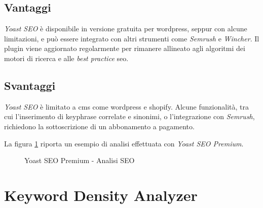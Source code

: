 \subsection{Vantaggi}
\par \textit{Yoast SEO} è disponibile in versione gratuita per \gls{wordpress}, seppur con alcune limitazioni, e può essere integrato con altri strumenti come \textit{Semrush} e \textit{Wincher}. Il plugin viene aggiornato regolarmente per rimanere allineato agli algoritmi dei motori di ricerca e alle \textit{best practice} \gls{seo}.

\subsection{Svantaggi}
\par \textit{Yoast SEO} è limitato a \gls{cms} come \gls{wordpress} e \gls{shopify}. Alcune funzionalità, tra cui l'inserimento di keyphrase correlate e sinonimi, o l'integrazione con \textit{Semrush}, richiedono la sottoscrizione di un abbonamento a pagamento.

\vspace{15pt}
\par\noindent La figura \ref{fig:yoast_seo} riporta un esempio di analisi effettuata con \textit{Yoast SEO Premium}.

\begin{figure}[H]
    \centering 
    \caption{Yoast SEO Premium - Analisi SEO}
    \label{fig:yoast_seo}
\end{figure}

\section{Keyword Density Analyzer}

